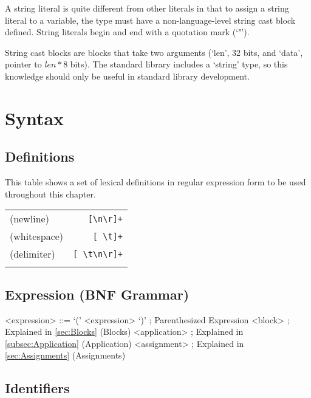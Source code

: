 \documentclass[letterpaper,titlepage]{scrreprt}
\begin{document}
A string literal is quite different from other literals in that to assign a string literal to a variable, the type must have a non-language-level string cast block defined. String literals begin and end with a quotation mark (`"').

String cast blocks are blocks that take two arguments (`len', 32 bits, and `data', pointer to $len * 8$ bits). The standard library includes a `string' type, so this knowledge should only be useful in standard library development.

\chapter{Syntax}
\label{ch:Syntax}

\section{Definitions}
\label{sec:Definitions}

This table shows a set of lexical definitions in regular expression form to be used throughout this chapter.

\begin{tabular}{l r}

(newline) & \lstinline|[\n\r]+| \\
\label{def:newline}
(whitespace) & \lstinline|[ \t]+| \\
\label{def:whitespace}
(delimiter) & \lstinline|[ \t\n\r]+| \\
\label{def:delimiter}

\end{tabular}

\section{Expression (BNF Grammar)}
\label{sec:Expression}

\begin{grammar}

<expression> ::= `(' <expression> `)' ; Parenthesized Expression
\alt <block> ; Explained in \hyperref[sec:Blocks]{\ref{sec:Blocks}} (Blocks)
\alt <application> ; Explained in \hyperref[subsec:Application]{\ref{subsec:Application}} (Application)
\alt <assignment> ; Explained in \hyperref[sec:Assignments]{\ref{sec:Assignments}} (Assignments)

\end{grammar}

\section{Identifiers}
\label{sec:Identifiers}
\end{document}
